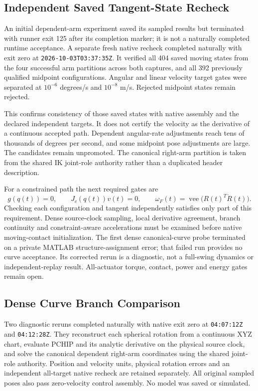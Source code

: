 \documentclass[11pt,a4paper]{article}
\begin{document}
\subsection{Independent Saved Tangent-State Recheck}
\label{sec:dependent-arm-strict-recheck}
An initial dependent-arm experiment saved its sampled results but terminated
with runner exit 125 after its completion marker; it is not a naturally
completed runtime acceptance. A separate fresh native recheck completed
naturally with exit zero at \texttt{2026-10-03T03:37:35Z}. It verified all
404 saved moving states from the four successful arm partitions across both
captures, and all 392 previously qualified midpoint configurations. Angular
and linear velocity target gates were separated at $10^{-6}$ degrees/s and
$10^{-8}$ m/s. Rejected midpoint states remain rejected.

This confirms consistency of those saved states with native assembly and
the declared independent targets. It does not certify the velocity as the
derivative of a continuous accepted path. Dependent angular-rate adjustments
reach tens of thousands of degrees per second, and some midpoint pose
adjustments are large. The candidates remain unpromoted. The canonical
right-arm partition is taken from the shared IK joint-role authority rather
than a duplicated header description.

For a constrained path the next required gates are
\[
 g(q(t))=0,\qquad J_c(q(t))v(t)=0,\qquad
 \omega_F(t)=\operatorname{vee}\bigl(R(t)^T\dot R(t)\bigr).
\]
Checking each configuration and tangent independently satisfies only part
of this requirement. Dense source-clock sampling, local derivative agreement,
branch continuity and constraint-aware accelerations must be examined before
native moving-contact initialization. The first dense canonical-curve probe
terminated on a private MATLAB structure-assignment error; that failed run
provides no curve acceptance. Its corrected rerun is a diagnostic, not a
full-swing dynamics or independent-replay result. All-actuator torque,
contact, power and energy gates remain open.


\subsection{Dense Curve Branch Comparison}
\label{sec:dense-curve-branch-comparison}
Two diagnostic reruns completed naturally with native exit zero at
\texttt{04:07:12Z} and \texttt{04:12:28Z}. They reconstruct each spherical
rotation from a continuous XYZ chart, evaluate PCHIP and its analytic
derivative on the physical source clock, and solve the canonical dependent
right-arm coordinates using the shared joint-role authority. Position and
velocity units, physical rotation errors and an independent all-target
native recheck are retained separately. All original sampled poses also
pass zero-velocity control assembly. No model was saved or simulated.
\end{document}
